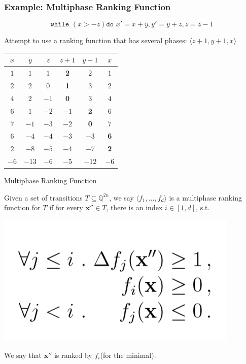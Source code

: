 \documentclass[11pt]{beamer}
\begin{document}
\begin{frame}\frametitle{Example: Multiphase Ranking Function}
\[\texttt{while }( x > -z) \texttt{do } x' = x + y, y' = y + z, z = z - 1\]

Attempt to use a ranking function that has several phases: 
$\langle z + 1, y + 1, x\rangle$
\begin{center}
\begin{tabular}{|c|c|c|c|c|c|}
\hline 
$x$&$y$&$z$&$z+1$&$y+1$&$x$\\
\hline
$1$&$1$&$1$&\textbf{2}&$2$&$1$\\
$2$&$2$&$0$&\textbf{1}&$3$&$2$\\
$4$&$2$&$-1$&\textbf{0}&$3$&$4$\\
\hline
$6$&$1$&$-2$&$-1$&\textbf{2}&$6$\\
$7$&$-1$&$-3$&$-2$&\textbf{0}&$7$\\
\hline
$6$&$-4$&$-4$&$-3$&$-3$&\textbf{6}\\
$2$&$-8$&$-5$&$-4$&$-7$&\textbf{2}\\
\hline
$-6$&$-13$&$-6$&$-5$&$-12$&$-6$\\
\hline
\end{tabular}
\end{center}
\end{frame}



\begin{frame}{Multiphase Ranking Function}
\begin{definition}
Given a set of transitions $T\subseteq \mathbb{Q}^{2n}$, we say $\langle f_1, \ldots, f_d\rangle$ is a multiphase ranking function for $T$ if for every $\textbf{x}'' \in T$, there is an index $i\in [1, d]$, s.t.

\begin{center}
\includegraphics[scale = 0.3]{3.png}
\end{center}
We say that $\textbf{x}''$ is ranked by $f_i$(for the minimal).
\end{definition}


\end{frame}
\end{document}
